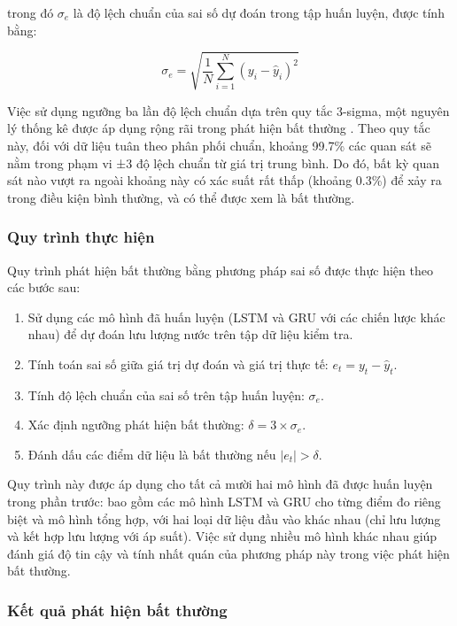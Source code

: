 trong đó \(\sigma_e\) là độ lệch chuẩn của sai số dự đoán trong tập huấn luyện, được tính bằng:

\begin{equation}
\sigma_e = \sqrt{\frac{1}{N} \sum_{i=1}^{N} (y_i - \hat{y}_i)^2}
\end{equation}

Việc sử dụng ngưỡng ba lần độ lệch chuẩn dựa trên quy tắc 3-sigma, một nguyên lý thống kê được áp dụng rộng rãi trong phát hiện bất thường \cite{malhotra2016lstm, hundman2018detecting}. Theo quy tắc này, đối với dữ liệu tuân theo phân phối chuẩn, khoảng 99.7\% các quan sát sẽ nằm trong phạm vi ±3 độ lệch chuẩn từ giá trị trung bình. Do đó, bất kỳ quan sát nào vượt ra ngoài khoảng này có xác suất rất thấp (khoảng 0.3\%) để xảy ra trong điều kiện bình thường, và có thể được xem là bất thường.

\subsubsection{Quy trình thực hiện}
Quy trình phát hiện bất thường bằng phương pháp sai số được thực hiện theo các bước sau:

\begin{enumerate}
    \item Sử dụng các mô hình đã huấn luyện (LSTM và GRU với các chiến lược khác nhau) để dự đoán lưu lượng nước trên tập dữ liệu kiểm tra.
    \item Tính toán sai số giữa giá trị dự đoán và giá trị thực tế: \(e_t = y_t - \hat{y}_t\).
    \item Tính độ lệch chuẩn của sai số trên tập huấn luyện: \(\sigma_e\).
    \item Xác định ngưỡng phát hiện bất thường: \(\delta = 3 \times \sigma_e\).
    \item Đánh dấu các điểm dữ liệu là bất thường nếu \(|e_t| > \delta\).
\end{enumerate}

Quy trình này được áp dụng cho tất cả mười hai mô hình đã được huấn luyện trong phần trước: bao gồm các mô hình LSTM và GRU cho từng điểm đo riêng biệt và mô hình tổng hợp, với hai loại dữ liệu đầu vào khác nhau (chỉ lưu lượng và kết hợp lưu lượng với áp suất). Việc sử dụng nhiều mô hình khác nhau giúp đánh giá độ tin cậy và tính nhất quán của phương pháp này trong việc phát hiện bất thường.

\subsubsection{Kết quả phát hiện bất thường}

